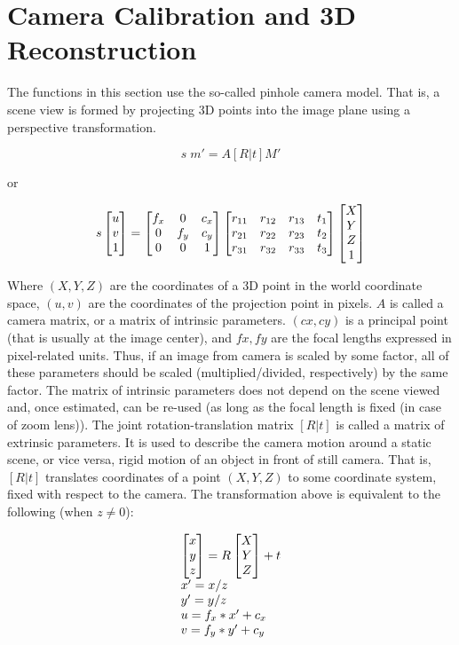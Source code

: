 \section{Camera Calibration and 3D Reconstruction}

The functions in this section use the so-called pinhole camera model. That
is, a scene view is formed by projecting 3D points into the image plane
using a perspective transformation.

\[
s \; m' = A [R|t] M'
\]

or

\[
s \begin{bmatrix} u\\ v\\ 1 \end{bmatrix} = \begin{bmatrix} f_x & 0 & c_x\\ 0 & f_y & c_y\\ 0 & 0 & 1 \end{bmatrix}
\begin{bmatrix}
 r_{11} & r_{12} & r_{13} & t_1 \\
 r_{21} & r_{22} & r_{23} & t_2 \\
 r_{31} & r_{32} & r_{33} & t_3
\end{bmatrix}
\begin{bmatrix}X\\Y\\Z\\1 \end{bmatrix}
\]

Where $(X, Y, Z)$ are the coordinates of a 3D point in the world
coordinate space, $(u, v)$ are the coordinates of the projection point
in pixels. $A$ is called a camera matrix, or a matrix of
intrinsic parameters. $(cx, cy)$ is a principal point (that is
usually at the image center), and $fx, fy$ are the focal lengths
expressed in pixel-related units. Thus, if an image from camera is
scaled by some factor, all of these parameters should
be scaled (multiplied/divided, respectively) by the same factor. The
matrix of intrinsic parameters does not depend on the scene viewed and,
once estimated, can be re-used (as long as the focal length is fixed (in
case of zoom lens)). The joint rotation-translation matrix $[R|t]$
is called a matrix of extrinsic parameters. It is used to describe the
camera motion around a static scene, or vice versa, rigid motion of an
object in front of still camera. That is, $[R|t]$ translates
coordinates of a point $(X, Y, Z)$ to some coordinate system,
fixed with respect to the camera. The transformation above is equivalent
to the following (when $z \ne 0$):

\[
\begin{array}{l}
\begin{bmatrix} x\\ y\\ z \end{bmatrix} = R \begin{bmatrix} X\\ Y\\ Z \end{bmatrix} + t\\
x' = x/z\\
y' = y/z\\
u = f_x*x' + c_x\\
v = f_y*y' + c_y
\end{array}
\]

